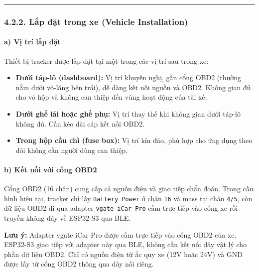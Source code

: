 \documentclass[13pt,a4paper]{extarticle}
\renewcommand{\\}{\thesislongtableorignewline\hline}%
\providecommand{\tightlist}{%
  \setlength{\itemsep}{0pt}\setlength{\parskip}{0pt}}
\begin{document}
\begin{center}\rule{0.5\linewidth}{0.5pt}\end{center}

\subsubsection{4.2.2. Lắp đặt trong xe (Vehicle
Installation)}\label{422-lux1eafp-ux111ux1eb7t-trong-xe-vehicle-installation}

\paragraph{a) Vị trí lắp
đặt}\label{a-vux1ecb-truxed-lux1eafp-ux111ux1eb7t}

Thiết bị tracker được lắp đặt tại một trong các vị trí sau trong xe:

\begin{itemize}
\tightlist
\item
  \textbf{Dưới táp-lô (dashboard):} Vị trí khuyến nghị, gần cổng OBD2
  (thường nằm dưới vô-lăng bên trái), dễ dàng kết nối nguồn và OBD2.
  Không gian đủ cho vỏ hộp và không can thiệp đến vùng hoạt động của tài
  xế.
\item
  \textbf{Dưới ghế lái hoặc ghế phụ:} Vị trí thay thế khi không gian
  dưới táp-lô không đủ. Cần kéo dài cáp kết nối OBD2.
\item
  \textbf{Trong hộp cầu chì (fuse box):} Vị trí kín đáo, phù hợp cho ứng
  dụng theo dõi không cần người dùng can thiệp.
\end{itemize}

\paragraph{b) Kết nối với cổng
OBD2}\label{b-kux1ebft-nux1ed1i-vux1edbi-cux1ed5ng-obd2}

Cổng OBD2 (16 chân) cung cấp cả nguồn điện và giao tiếp chẩn đoán. Trong
cấu hình hiện tại, tracker chỉ lấy \texttt{Battery\ Power} ở chân
\texttt{16} và mass tại chân \texttt{4/5}, còn dữ liệu OBD2 đi qua
adapter \texttt{vgate\ iCar\ Pro} cắm trực tiếp vào cổng xe rồi truyền
không dây về ESP32-S3 qua BLE.

\textbf{Lưu ý:} Adapter vgate iCar Pro được cắm trực tiếp vào cổng OBD2
của xe. ESP32-S3 giao tiếp với adapter này qua BLE, không cần kết nối
dây vật lý cho phần dữ liệu OBD2. Chỉ có nguồn điện từ ắc quy xe (12V
hoặc 24V) và GND được lấy từ cổng OBD2 thông qua dây nối riêng.
\end{document}
